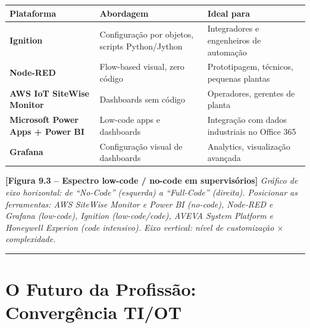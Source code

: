 \begin{longtable}[]{@{}
  >{\raggedright\arraybackslash}p{}
  >{\raggedright\arraybackslash}p{}
  >{\raggedright\arraybackslash}p{}@{}}
\toprule\noalign{}
\begin{minipage}[b]{\linewidth}\raggedright
Plataforma
\end{minipage} & \begin{minipage}[b]{\linewidth}\raggedright
Abordagem
\end{minipage} & \begin{minipage}[b]{\linewidth}\raggedright
Ideal para
\end{minipage} \\
\midrule\noalign{}
\endhead
\bottomrule\noalign{}
\endlastfoot
\textbf{Ignition} & Configuração por objetos, scripts Python/Jython & Integradores e engenheiros de automação \\
\textbf{Node-RED} & Flow-based visual, zero código & Prototipagem, técnicos, pequenas plantas \\
\textbf{AWS IoT SiteWise Monitor} & Dashboards sem código & Operadores, gerentes de planta \\
\textbf{Microsoft Power Apps + Power BI} & Low-code apps e dashboards & Integração com dados industriais no Office 365 \\
\textbf{Grafana} & Configuração visual de dashboards & Analytics, visualização avançada \\
\end{longtable}

\begin{caixafigura}

\textbf{{[}Figura 9.3 -- Espectro low-code / no-code em supervisórios{]}}
\emph{Gráfico de eixo horizontal: de ``No-Code'' (esquerda) a ``Full-Code'' (direita). Posicionar as ferramentas: AWS SiteWise Monitor e Power BI (no-code), Node-RED e Grafana (low-code), Ignition (low-code/code), AVEVA System Platform e Honeywell Experion (code intensivo). Eixo vertical: nível de customização \ensuremath{\times} complexidade.}

\end{caixafigura}

\begin{center}\rule{0.5\linewidth}{0.5pt}\end{center}

\section{O Futuro da Profissão: Convergência TI/OT}\label{o-futuro-da-profissuxe3o-converguxeancia-tiot}

